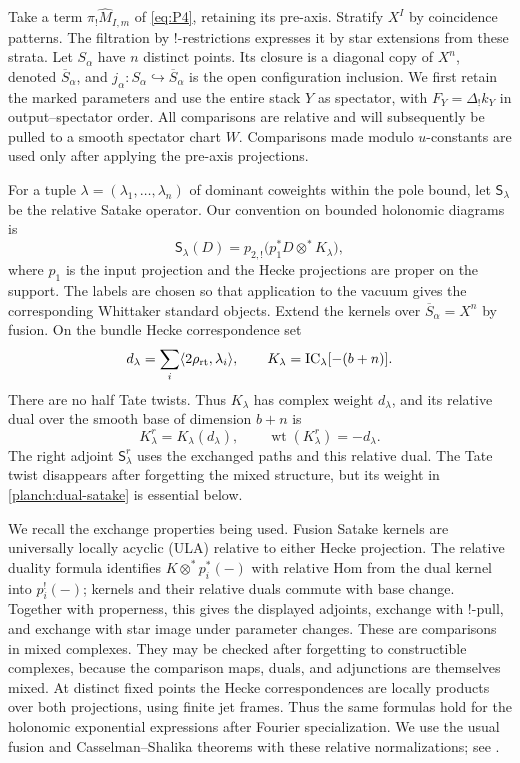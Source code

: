 Take a term $\pi_!\widehat M_{I,m}$ of \eqref{eq:P4}, retaining its
pre-axis.  Stratify $X^I$ by coincidence patterns.  The filtration by
$!$-restrictions expresses it by star extensions from these strata.
Let $S_\alpha$ have $n$ distinct points.  Its closure is a diagonal copy
of $X^n$, denoted $\overline S_\alpha$, and
$j_\alpha:S_\alpha\hookrightarrow\overline S_\alpha$ is the open
configuration inclusion.  We first retain the marked parameters and
use the entire stack $Y$ as spectator, with
$F_Y=\Delta_!k_Y$ in output--spectator order.  All comparisons are
relative and will subsequently
be pulled to a smooth spectator chart $W$.  Comparisons made modulo
$u$-constants are used only after applying the pre-axis projections.

For a tuple $\lambda=(\lambda_1,\ldots,\lambda_n)$ of dominant
coweights within the pole bound, let $\mathsf S_\lambda$ be the relative
Satake operator.  Our convention on bounded holonomic diagrams is
\[
 \mathsf S_\lambda(D)
   =p_{2,!}\bigl(p_1^*D\otimes^* K_\lambda\bigr),
\]
where $p_1$ is the input projection and the Hecke projections are proper
on the support.  The labels are chosen so that application to the
vacuum gives the corresponding Whittaker standard objects.  Extend
the kernels over $\overline S_\alpha=X^n$ by fusion.  On the bundle
Hecke correspondence set
\[
 d_\lambda=\sum_i\langle2\rho_{\rm rt},\lambda_i\rangle,
 \qquad
 K_\lambda=\operatorname{IC}_\lambda[-(b+n)].
\]
There are no half Tate twists.  Thus $K_\lambda$ has complex weight
$d_\lambda$, and its relative dual over the smooth base of dimension
$b+n$ is
\begin{equation}
 K_\lambda^r=K_\lambda(d_\lambda),\qquad
 \operatorname{wt}(K_\lambda^r)=-d_\lambda.
 \label{planch:dual-satake}
\end{equation}
The right adjoint $\mathsf S_\lambda^r$ uses the exchanged paths and
this relative dual.  The Tate twist disappears after forgetting the
mixed structure, but its weight in \eqref{planch:dual-satake} is
essential below.

We recall the exchange properties being used.  Fusion Satake kernels
are universally locally acyclic (ULA) relative to either Hecke
projection.  The relative duality formula identifies
$K\otimes^*p_i^*(-)$ with relative Hom from the dual kernel into
$p_i^!(-)$; kernels and their relative duals commute with base change.
Together with properness, this gives the displayed adjoints, exchange
with $!$-pull, and exchange with star image under parameter changes.
These are comparisons in mixed complexes.  They may be checked after
forgetting to constructible complexes, because the comparison maps,
duals, and adjunctions are themselves mixed.  At distinct fixed points
the Hecke correspondences are locally products over both projections,
using finite jet frames.  Thus the same formulas hold for the
holonomic exponential expressions after Fourier specialization.
We use the usual fusion and Casselman--Shalika theorems with these
relative normalizations; see \cite{BravermanGaitsgory,GLCII}.

